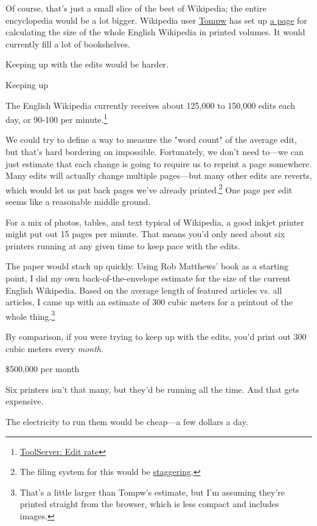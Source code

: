 {{Of course, that's just a small slice of the best of Wikipedia; the entire encyclopedia would be a lot bigger. Wikipedia user \href{http://en.wikipedia.org/wiki/User:Tompw}{Tompw} has set up \href{http://en.wikipedia.org/wiki/Wikipedia:Size\_in\_volumes}{a page} for calculating the size of the whole English Wikipedia in printed volumes. It would currently fill a lot of bookshelves.}

{Keeping up with the edits would be harder.}

{Keeping up}

{The English Wikipedia currently receives about 125,000 to 150,000 edits each day, or 90-100 per minute.{\footnote{ \href{http://toolserver.org/\~emijrp/wmcharts/wmchart0001.php}{ToolServer: Edit rate}} } }

{We could try to define a way to measure the "word count" of the average edit, but that's hard bordering on impossible. Fortunately, we don't need to—we can just estimate that each change is going to require us to reprint a page somewhere. Many edits will actually change multiple pages—but many other edits are reverts, which would let us put back pages we've already printed.{\footnote{The filing system for this would be \href{http://commons.wikimedia.org/wiki/File:IBM\_card\_storage.NARA.jpg}{staggering}.} } One page per edit seems like a reasonable middle ground.}

{For a mix of photos, tables, and text typical of Wikipedia, a good inkjet printer might put out 15 pages per minute. That means you'd only need about six printers running at any given time to keep pace with the edits.}

{The paper would stack up quickly. Using Rob Matthews' book as a starting point, I did my own back-of-the-envelope estimate for the size of the current English Wikipedia. Based on the average length of featured articles vs. all articles, I came up with an estimate of 300 cubic meters for a printout of the whole thing.{\footnote{That's a little larger than Tompw's estimate, but I'm assuming they're printed straight from the browser, which is less compact and includes images.} } }

{By comparison, if you were trying to keep up with the edits, you'd print out 300 cubic meters every \emph{month}.}

{\$500,000 per month}

{Six printers isn't that many, but they'd be running all the time. And that gets expensive.}

{The electricity to run them would be cheap—a few dollars a day.}

}
